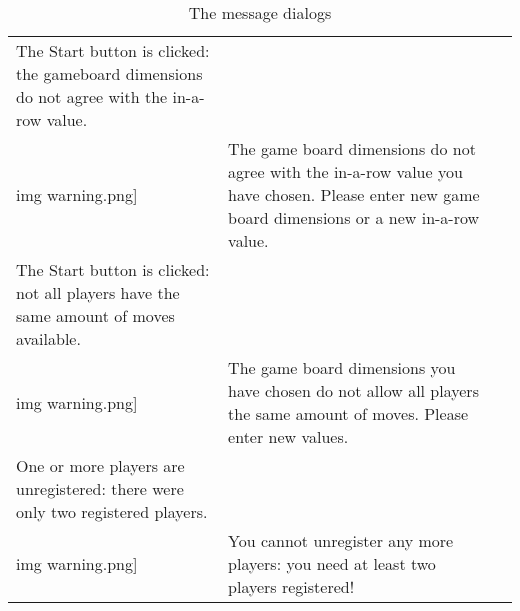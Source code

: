 \begin{table}[H]
\begin{longtable}{|p{}
                    |p{}
                    |p{}|}
    The Start button is clicked: the gameboard dimensions do not
    agree with the in-a-row value.                                 &
    \texttt{[image: \\img warning.png]}     &
    The game board dimensions do not agree with the in-a-row value
    you have chosen. Please enter new game board dimensions or a
    new in-a-row value.                                            \\\hline

    The Start button is clicked: not all players have the same amount
    of moves available.                                                &
    \texttt{[image: \\img warning.png]}         &
    The game board dimensions you have chosen do not allow all players
    the same amount of moves. Please enter new values.                 \\\hline

    One or more players are unregistered: there were only two
    registered players.                                        &
    \texttt{[image: \\img warning.png]} &
    You cannot unregister any more players: you need at least
    two players registered!                                    \\\hline

  \end{longtable}
  \caption{The  message dialogs}
  \label{tab:MessageDialogs}
\end{table}


